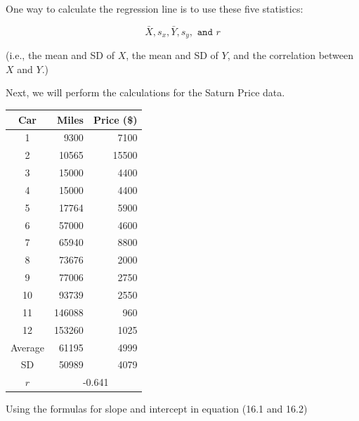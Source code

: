 \documentclass[11pt, chapterprefix=true]{scrbook}\usepackage[]{graphicx}\usepackage[]{color}
\begin{document}
One way to calculate the regression line is to use these five statistics:

$$ \bar{X}, s_x, \bar{Y},s_y, \texttt{ and } r  $$

(i.e., the mean and SD of $X$, the mean and SD of $Y$, and the correlation between $X$ and $Y$.)

\begin{center}
\end{center}

Next, we will perform the calculations for the Saturn Price data. 

\begin{table}[ht]
\centering 
\begin{tabular}{@{} c rr @{}} \hline 
Car & Miles & Price (\$) \\ \hline
1 & 9300 & 7100 \\
2 & 10565 & 15500 \\
3 & 15000 & 4400 \\
4 & 15000 & 4400 \\
5 & 17764 & 5900 \\
6 & 57000 & 4600 \\
7 & 65940 & 8800 \\
8 & 73676 & 2000 \\
9 & 77006 & 2750 \\
10 & 93739 & 2550 \\
11 & 146088 & 960 \\
12 & 153260 & 1025 \\ \hline
Average & 61195 & 4999 \\
SD  & 50989 & 4079 \\
$r$ & \multicolumn{2}{c}{-0.641} \\ \hline
\end{tabular}
\end{table}

Using the formulas for slope and intercept in equation (16.1 and 16.2)
\end{document}

